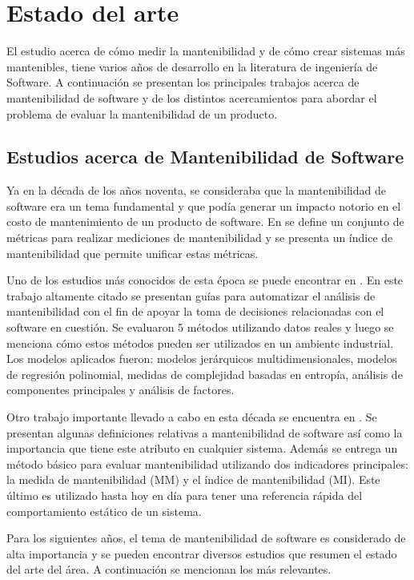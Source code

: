 \chapter{Estado del arte}
\label{chap:arte}

El estudio acerca de cómo medir la mantenibilidad y de cómo crear sistemas
más mantenibles, tiene varios años de desarrollo en la literatura de ingeniería de Software.
A continuación se presentan los principales trabajos acerca de mantenibilidad
de software y de los distintos acercamientos para abordar el problema
de evaluar la mantenibilidad de un producto.

\section{Estudios acerca de Mantenibilidad de Software}

Ya en la década de los años noventa, se consideraba que la mantenibilidad
de software era un tema fundamental y que podía generar un impacto notorio
en el costo de mantenimiento de un producto de software. En \cite{Oman:1992}
se define un conjunto de métricas para realizar mediciones de mantenibilidad y se
presenta un índice de mantenibilidad que permite unificar estas métricas.

Uno de los estudios más conocidos de esta época se puede encontrar en \cite{Coleman:1994}.
En este trabajo altamente citado se presentan guías  para automatizar el análisis de
mantenibilidad con el fin de apoyar la toma de decisiones relacionadas con el
software en cuestión. Se evaluaron 5 métodos utilizando datos reales y luego
se menciona cómo estos métodos pueden ser utilizados en un ambiente industrial.
Los modelos aplicados fueron: modelos jerárquicos multidimensionales, modelos
de regresión polinomial, medidas de complejidad basadas en entropía, análisis
de componentes principales y análisis de factores.

Otro trabajo importante llevado a cabo en esta década se
encuentra en \cite{West:1996}. Se presentan algunas definiciones
relativas a mantenibilidad de software así como la importancia que tiene
este atributo en cualquier sistema. Además se entrega un método básico
para evaluar mantenibilidad utilizando dos indicadores principales: la
medida de mantenibilidad (MM) y el índice de mantenibilidad (MI). Este último
es utilizado hasta hoy en día para tener una referencia rápida del comportamiento
estático de un sistema.

Para los siguientes años, el tema de mantenibilidad de software es considerado
de alta importancia y se pueden encontrar diversos estudios que resumen
el estado del arte del área. A continuación se mencionan los más relevantes.

